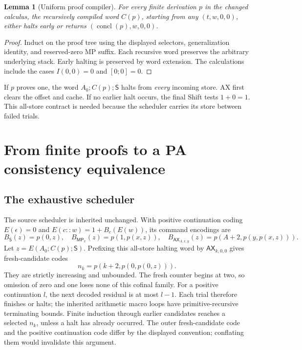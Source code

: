 \documentclass[11pt,letterpaper]{article}
\newtheorem{lemma}[theorem]{Lemma}
\newcommand{\AX}{\mathsf{AX}}
\newcommand{\MP}{\mathsf{MP}}
\newcommand{\Shift}{\mathsf S}
\begin{document}
\begin{lemma}[Uniform proof compiler]
For every finite derivation $p$ in the changed calculus, the recursively
compiled word $C(p)$, starting from any $(t,w,0,0)$, either halts early
or returns $(\operatorname{concl}(p),w,0,0)$.
\end{lemma}
\begin{proof}
Induct on the proof tree using the displayed selectors, generalization
identity, and reserved-zero MP suffix. Each recursive word preserves the
arbitrary underlying stack. Early halting is preserved by word extension.
The calculations include the cases $I(0,0)=0$ and $[0;0]=0$.
\end{proof}

If $p$ proves one, the word $A_0;C(p);\Shift$ halts from \emph{every}
incoming store. AX first clears the offset and cache. If no earlier halt
occurs, the final Shift tests $1+0=1$. This all-store contract is needed
because the scheduler carries its store between failed trials.

\section{From finite proofs to a PA consistency equivalence}
\label{sec:calibration}

\subsection{The exhaustive scheduler}

The source scheduler is inherited unchanged. With positive continuation
coding $E(\epsilon)=0$ and $E(c::w)=1+B_c(E(w))$, its command encodings are
\[
B_{\Shift}(z)=p(0,z),\quad B_{\MP_x}(z)=p(1,p(x,z)),\quad
B_{\AX_{A,x,y}}(z)=p(A+2,p(y,p(x,z))).
\]
Let $z=E(A_0;C(p);\Shift)$. Prefixing this all-store halting word by
$\AX_{k,0,0}$ gives fresh-candidate codes
\[
n_k=p(k+2,p(0,p(0,z))).
\]
They are strictly increasing and unbounded. The fresh counter begins at
two, so omission of zero and one loses none of this cofinal family.
For a positive continuation $l$, the next decoded residual is at most
$l-1$. Each trial therefore finishes or halts; the inherited arithmetic
macro loops have primitive-recursive terminating bounds. Finite induction
through earlier candidates reaches a selected $n_k$, unless a halt has
already occurred. The outer fresh-candidate code and the positive
continuation code differ by the displayed convention; conflating them
would invalidate this argument.
\end{document}
